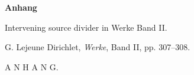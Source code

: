 \documentclass[11pt]{article}
\begin{document}
\begin{center}
{\Large\bfseries Anhang\par}
\vspace{0.35em}
{\normalsize Intervening source divider in Werke Band II.\par}
\vspace{0.8em}
{\small G. Lejeune Dirichlet, \emph{Werke}, Band II, pp. 307--308.}
\end{center}


\thispagestyle{empty}
\vspace*{0.38\textheight}
\begin{center}
{\Huge A N H A N G.}
\end{center}
\end{document}
